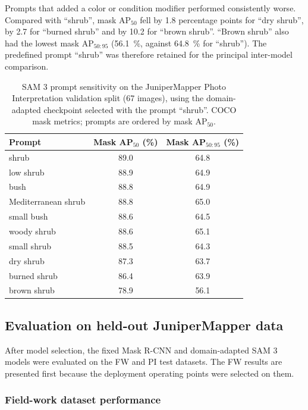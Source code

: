 \documentclass[12pt,a4paper]{article}
\begin{document}
Prompts that added a color or condition modifier performed consistently worse. Compared with ``shrub'', mask AP$_{50}$ fell by 1.8 percentage points for ``dry shrub'', by 2.7 for ``burned shrub'' and by 10.2 for ``brown shrub''. ``Brown shrub'' also had the lowest mask AP$_{50:95}$ (\qty{56.1}{\percent}, against \qty{64.8}{\percent} for ``shrub''). The predefined prompt ``shrub'' was therefore retained for the principal inter-model comparison.

\begin{table}[ht]
    \centering
    \caption{
        SAM 3 prompt sensitivity on the JuniperMapper Photo Interpretation validation split (67 images), using the domain-adapted checkpoint selected with the prompt ``shrub''. COCO mask metrics; prompts are ordered by mask AP$_{50}$.
    }
    \label{tab:prompt_sensitivity}
    \begin{tabular}{lcc}
        \toprule
        Prompt & Mask AP$_{50}$ (\%) & Mask AP$_{50:95}$ (\%) \\
        \midrule
        shrub & 89.0 & 64.8 \\
        low shrub & 88.9 & 64.9 \\
        bush & 88.8 & 64.9 \\
        Mediterranean shrub & 88.8 & 65.0 \\
        small bush & 88.6 & 64.5 \\
        woody shrub & 88.6 & 65.1 \\
        small shrub & 88.5 & 64.3 \\
        dry shrub & 87.3 & 63.7 \\
        burned shrub & 86.4 & 63.9 \\
        brown shrub & 78.9 & 56.1 \\
        \bottomrule
    \end{tabular}
\end{table}

\subsection{Evaluation on held-out JuniperMapper data}

After model selection, the fixed Mask R-CNN and domain-adapted SAM 3 models were evaluated on the FW and PI test datasets. The FW results are presented first because the deployment operating points were selected on them.

\subsubsection{Field-work dataset performance}
\end{document}
